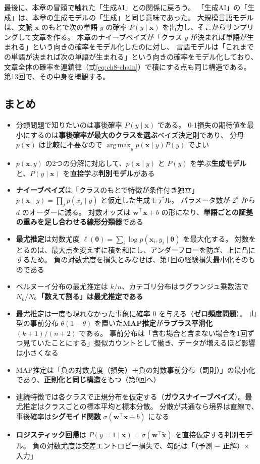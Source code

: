 最後に、本章の冒頭で触れた「生成AI」との関係に戻ろう。
「生成AI」の「生成」は、本章の生成モデルの「生成」と同じ意味であった。
大規模言語モデルは、文脈 $\bm{x}$ のもとで次の単語 $y$ の確率 $P(y \mid \bm{x})$ を出力し、そこからサンプリングして文章を作る。
本章のナイーブベイズが「クラス $y$ が決まれば単語が生まれる」という向きの確率をモデル化したのに対し、
言語モデルは「これまでの単語が決まれば次の単語が生まれる」という向きの確率をモデル化しており、
文章全体の確率を連鎖律（式\eqref{eq:ch8-chain}）で積にする点も同じ構造である。
第13回で、その中身を概観する。


\subsection{まとめ}

\begin{itemize}
  \item 分類問題で知りたいのは事後確率 $P(y \mid \bm{x})$ である。
    0-1損失の期待値を最小にするのは\textbf{事後確率が最大のクラスを選ぶ}ベイズ決定則であり、
    分母 $p(\bm{x})$ は比較に不要なので $\operatorname*{arg\,max}_y p(\bm{x} \mid y)P(y)$ でよい
  \item $p(\bm{x}, y)$ の2つの分解に対応して、$p(\bm{x} \mid y)$ と $P(y)$ を学ぶ\textbf{生成モデル}と、$P(y \mid \bm{x})$ を直接学ぶ\textbf{判別モデル}がある
  \item \textbf{ナイーブベイズ}は「クラスのもとで特徴が条件付き独立」$p(\bm{x} \mid y) = \prod_j p(x_j \mid y)$ と仮定した生成モデル。
    パラメータ数が $2^d$ から $d$ のオーダーに減る。
    対数オッズは $\bm{w}^\top\bm{x} + b$ の形になり、\textbf{単語ごとの証拠の重みを足し合わせる線形分類器}である
  \item \textbf{最尤推定}は対数尤度 $\ell(\bm{\theta}) = \sum_i \log p(\bm{x}_i, y_i \mid \bm{\theta})$ を最大化する。
    対数をとるのは、最大点を変えずに積を和にし、アンダーフローを防ぎ、上に凸にするため。
    負の対数尤度を損失とみなせば、第1回の経験損失最小化そのものである
  \item ベルヌーイ分布の最尤推定は $k/n$、カテゴリ分布はラグランジュ乗数法で $N_k/N$。\textbf{「数えて割る」は最尤推定である}
  \item 最尤推定は一度も現れなかった事象に確率 $0$ を与える（\textbf{ゼロ頻度問題}）。
    山型の事前分布 $\theta(1 - \theta)$ を置いた\textbf{MAP推定}が\textbf{ラプラス平滑化} $(k + 1)/(n + 2)$ である。
    事前分布は「含む場合と含まない場合を1回ずつ見ていたことにする」擬似カウントとして働き、データが増えるほど影響は小さくなる
  \item MAP推定は「負の対数尤度（損失）＋負の対数事前分布（罰則）」の最小化であり、\textbf{正則化と同じ構造}をもつ（第9回へ）
  \item 連続特徴では各クラスで正規分布を仮定する（\textbf{ガウスナイーブベイズ}）。最尤推定はクラスごとの標本平均と標本分散。
    分散が共通なら境界は直線で、事後確率は\textbf{シグモイド関数} $\sigma(\bm{w}^\top\bm{x} + b)$ になる
  \item \textbf{ロジスティック回帰}は $P(y = 1 \mid \bm{x}) = \sigma(\bm{w}^\top\tilde{\bm{x}})$ を直接仮定する判別モデル。
    負の対数尤度は交差エントロピー損失で、勾配は「（予測 $-$ 正解）$\times$ 入力」
\end{itemize}

